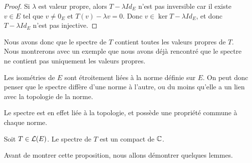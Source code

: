 \begin{proof}
	Si $\lambda$ est valeur propre, alors $T - \lambda Id_{E}$ n'est pas
	inversible car il existe $v \in E$ tel que $v \neq 0_{E}$ et $T(v) - \lambda
	v = 0$. Donc $v \in \ker{T - \lambda Id_{E}}$, et donc $T - \lambda Id_{E}$
	n'est pas injective.
\end{proof}

Nous avons donc que le spectre de $T$ contient toutes les valeurs propres de
$T$.
Nous montrerons avec un exemple que nous avons déjà rencontré que le spectre ne
contient pas uniquement les valeurs propres.

Les isométries de $E$ sont étroitement liées à la norme définie sur $E$. On peut
donc penser que le spectre diffère d'une norme à l'autre, ou du moins qu'elle a
un lien avec la topologie de la norme.

Le spectre est en effet liée à la topologie, et possède une propriété commune à
chaque norme.

\begin{proposition}
	Soit $T \in \mathcal{L}(E)$.
	Le spectre de $T$ est un compact de $\mathbb{C}$.
\end{proposition}

Avant de montrer cette proposition, nous allons démontrer quelques lemmes.
